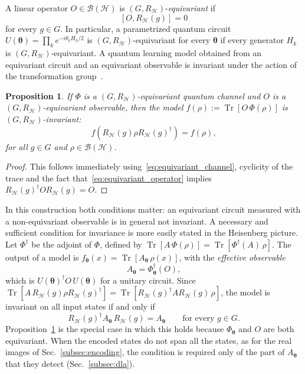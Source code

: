 \documentclass[aps,pra,reprint,superscriptaddress,longbibliography]{revtex4-2}
\newtheorem{proposition}{Proposition}
\newcommand{\tr}{\operatorname{Tr}}
\newcommand{\Hi}{\mathcal{H}}
\newcommand{\RH}{R_{\Hi}}
\begin{document}
A linear operator $O\in\mathcal{B}(\Hi)$ is $(G,\RH)$-\emph{equivariant} if 
\begin{equation}\label{eq:equivariant_operator}
    [O,\RH(g)]=0
\end{equation}
for every $g\in G$. In particular, a parametrized quantum circuit $U(\boldsymbol\theta)=\prod_k e^{-i\theta_kH_k/2}$ is $(G,\RH)$-equivariant for every $\boldsymbol\theta$ if every generator $H_k$ is $(G,\RH)$-equivariant. 
A quantum learning model obtained from an equivariant circuit and an equivariant observable is invariant under the action of the transformation group~\cite{larocca2022group, meyer2023exploiting}.

\begin{proposition}\label{prop:invariance}
If $\Phi$ is a $(G,\RH)$-equivariant quantum channel and $O$ is a $(G,\RH)$-equivariant observable, then the model $f(\rho):=\tr[O\,\Phi(\rho)]$ is $(G,\RH)$-invariant:
\begin{equation}
    f(\RH(g)\rho \RH(g)^\dagger)=f(\rho),
\end{equation}
for all $g\in G$ and $\rho\in\mathcal{B}(\Hi)$.
\end{proposition}
\begin{proof}
    This follows immediately using~\eqref{eq:equivariant_channel}, cyclicity of the trace and the fact that~\eqref{eq:equivariant_operator} implies $\RH(g)^\dagger O \RH(g)=O$.
\end{proof}
In this construction both conditions matter: an equivariant circuit measured with a non-equivariant observable is in general not invariant. A necessary and sufficient condition for invariance is more easily stated in the Heisenberg picture. Let $\Phi^\dagger$ be the adjoint of $\Phi$, defined by $\tr[A\,\Phi(\rho)]=\tr[\Phi^\dagger(A)\,\rho]$. The output of a model is $f_{\boldsymbol\theta}(x)=\tr[A_{\boldsymbol\theta}\,\rho(x)]$, with the \emph{effective observable}
\begin{equation}
A_{\boldsymbol\theta}=\Phi_{\boldsymbol\theta}^\dagger(O),
\label{eq:effective_observable}
\end{equation}
which is $U(\boldsymbol\theta)^\dagger O\,U(\boldsymbol\theta)$ for a unitary circuit. Since $\tr[A\,\RH(g)\rho\RH(g)^\dagger]=\tr[\RH(g)^\dagger A\RH(g)\,\rho]$, the model is invariant on all input states if and only if
\begin{equation}
\RH(g)^\dagger A_{\boldsymbol\theta}\,\RH(g)=A_{\boldsymbol\theta}\qquad\text{for every }g\in G.
\label{eq:invariance_criterion}
\end{equation}
Proposition~\ref{prop:invariance} is the special case in which this holds because $\Phi_{\boldsymbol\theta}$ and $O$ are both equivariant. When the encoded states do not span all the states, as for the real images of Sec.~\ref{subsec:encoding}, the condition is required only of the part of $A_{\boldsymbol\theta}$ that they detect (Sec.~\ref{subsec:dla}).
\end{document}
